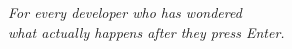 \cleardoublepage
\thispagestyle{empty}
\vspace*{2.4in}
\begin{center}
{\large\itshape\color{muted}For every developer who has wondered\\what actually happens after they press Enter.\par}
\end{center}
\clearpage
